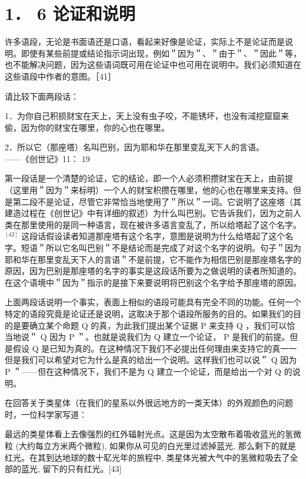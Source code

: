 \section*{1． 6 论证和说明}
许多语段，无论是书面语还是口语，看起来好像是论证，实际上不是论证而是说明。即使有某些前提或结论指示词出现，例如＂因为＂、＂由于＂、＂因此＂等，也不能解决问题，因为这些语词既可用在论证中也可用在说明中。我们必须知道在这些语段中作者的意图。［41］

请比较下面两段话：

1．为你自己积损财宝在天上，天上没有虫子咬，不能锈坏，也没有淢挖窟窟来偷，因为你的财宝在哪里，你的心也在哪里。

2．所以它（那座塔）名叫巴别，因为耶和华在那里变乱天下人的言语。\\
——《创世记》11： 19

第一段话是一个清楚的论证，它的结论，即一个人必须积攒财宝在天上，由前提（这里用＂因为＂来标明）一个人的财宝积攒在哪里，他的心也在哪里来支持。但是第二段不是论证，尽管它非常恰当地使用了＂所以＂一词。它说明了这座塔（其建造过程在《创世记》中有详细的叙述）为什么叫巴别。它告诉我们，因为之前人类在那里使用的是同一种语言，现在被许多语言变乱了，所以给塔起了这个名字。 ${ }^{[42]}$ 这段话假设读者知道那座塔有这个名字，意图是说明为什么给塔起了这个名字。短语＂所以它名叫巴别＂不是结论而是完成了对这个名字的说明。句子＂因为耶和华在那里变乱天下人的言语＂不是前提，它不能作为相信巴别是那座塔名字的原因，因为巴别是那座塔的名字的事实是这段话所要为之做说明的读者所知道的。在这个语境中＂因为＂指示的是接下来要说明将巴别这个名字给予那座塔的原因。

上面两段话说明一个事实，表面上相似的语段可能具有完全不同的功能。任何一个特定的语段究竟是论证还是说明，这取决于那个语段所服务的目的。如果我们的目的是要确立某个命题 Q 的真，为此我们提出某个证据 P 来支持 Q ，我们可以恰当地说＂ Q 因为 P ＂。也就是说我们为 Q 建立一个论证， P 是我们的前提。但是假设 Q 是已知为真的。在这种情况下我们不必提出任何理由来支持它的真一一但是我们可以希望对它为什么是真的给出一个说明。这样我们也可以说＂ Q 因为 P ＂——但在这种情况下，我们不是为 Q 建立一个论证，而是给出一个对 Q 的说明。

在回答关于类星体（在我们的星系以外很远地方的一类天体）的外观颜色的问题时，一位科学家写道：

\begin{displayquote}
最远的类星体看上去像强烈的红外辐射光点。这是因为太空散布着吸收蓝光的氢微粒 (大约每立方米两个微粒), 如果你从可见的白光里过滤掉蓝光, 那么剩下的就是红光。在其到达地球的数十䎲光年的旅程中, 类星体光被大气中的氢微粒吸去了全部的蓝光, 留下的只有红光。[43]
\end{displayquote}

